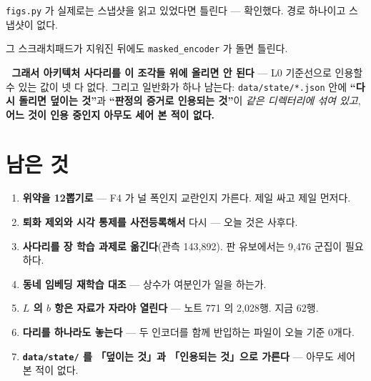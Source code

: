 \documentclass[10pt]{article}
\begin{document}
{\texttt{figs.py} 가 실제로는 스냅샷을 읽고 있었다면 틀린다 --- 확인했다. 경로 하나이고
스냅샷이 없다.}

{그 스크래치패드가 지워진 뒤에도 \texttt{masked\_encoder} 가 돌면 틀린다.}

🔴 \textbf{그래서 아키텍처 사다리를 이 조각들 위에 올리면 안 된다} --- L0 기준선으로
인용할 수 있는 값이 넷 다 없다. 그리고 일반화가 하나 남는다:
\texttt{data/state/*.json} 안에 \textbf{``다시 돌리면 덮이는 것''}과
\textbf{``판정의 증거로 인용되는 것''}이 \emph{같은 디렉터리에 섞여 있고},
\textbf{어느 것이 인용 중인지 아무도 세어 본 적이 없다.}

\section{남은 것}

\begin{enumerate}\setlength\itemsep{1pt}
\item \textbf{위약을 12뽑기로} --- F4 가 널 폭인지 교란인지 가른다. 제일 싸고 제일 먼저다.
\item \textbf{퇴화 제외와 시각 통제를 사전등록해서} 다시 --- 오늘 것은 사후다.
\item \textbf{사다리를 장 학습 과제로 옮긴다}(관측 143,892). 판 유보에서는 9,476 군집이 필요하다.
\item \textbf{동네 임베딩 재학습 대조} --- 상수가 여분인가 일을 하는가.
\item \textbf{$L$ 의 $b$ 항은 자료가 자라야 열린다} --- 노트 771 의 2,028행. 지금 62행.
\item \textbf{다리를 하나라도 놓는다} --- 두 인코더를 함께 반입하는 파일이 오늘 기준 0개다.
\item \textbf{\texttt{data/state/} 를 「덮이는 것」과 「인용되는 것」으로 가른다} --- 아무도 세어 본 적이 없다.
\end{enumerate}
\end{document}
